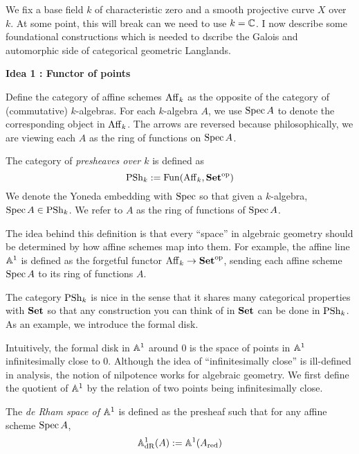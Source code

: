 \documentclass[./main.tex]{subfiles}
\begin{document}
We fix a base field $k$ of characteristic zero 
and a smooth projective curve $X$ over $k$.
At some point, this will break can we need to use $k = \mathbb{C}$.
I now describe some foundational constructions
which is needed to dscribe the Galois and automorphic side of
categorical geometric Langlands. 

\textbf{Idea 1 : Functor of points}

Define the category of affine schemes $\mathrm{Aff}_k$ as 
the opposite of the category of (commutative) $k$-algebras.
For each $k$-algebra $A$, 
we use $\operatorname{Spec} A$ to denote the corresponding object in $\mathrm{Aff}_k$.
The arrows are reversed because philosophically,
we are viewing each $A$ as the ring of functions on $\operatorname{Spec} A$.

\begin{dfn}

  The category of \emph{presheaves over $k$} 
  is defined as
  \[
    \operatorname{PSh}_k := \operatorname{Fun}(\mathrm{Aff}_k , \mathbf{Set}^{\mathrm{op}})
  \]
  We denote the Yoneda embedding with $\operatorname{Spec}$
  so that given a $k$-algebra, $\operatorname{Spec} A \in \operatorname{PSh}_k$.
  We refer to $A$ as the ring of functions of $\operatorname{Spec} A$.
\end{dfn}

The idea behind this definition is that
every ``space'' in algebraic geometry should be determined by
how affine schemes map into them.
For example, the affine line $\mathbb{A}^1$ is defined as the 
forgetful functor $\mathrm{Aff}_k \to \mathbf{Set}^{\mathrm{op}}$,
sending each affine scheme $\operatorname{Spec} A$ to its ring of functions $A$.

The category $\operatorname{PSh}_k$ is nice in the sense that
it shares many categorical properties with $\mathbf{Set}$
so that any construction you can think of in $\mathbf{Set}$ can be done in $\operatorname{PSh}_k$.
As an example, we introduce the formal disk.

Intuitively, the formal disk in $\mathbb{A}^1$ around $0$
is the space of points in $\mathbb{A}^1$ infinitesimally close to $0$.
Although the idea of ``infinitesimally close'' is
ill-defined in analysis, the notion of nilpotence works 
for algebraic geometry.
We first define the quotient of $\mathbb{A}^1$ by 
the relation of two points being infinitesimally close.

\begin{dfn}

  The \emph{de Rham space of $\mathbb{A}^1$} is defined as the presheaf
  such that for any affine scheme $\operatorname{Spec} A$,
  \[
    \mathbb{A}^1_{\mathrm{dR}}(A) := \mathbb{A}^1(A_{\mathrm{red}})
  \]

\end{dfn}
\end{document}
